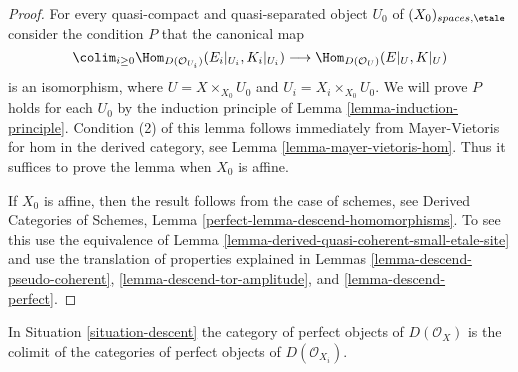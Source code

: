 \begin{proof}
For every quasi-compact and quasi-separated object $U_0$ of
$(X_0)_{spaces, \etale}$ consider the condition $P$ that the canonical
map
$$
\colim_{i \geq 0} \Hom_{D(\mathcal{O}_{U_i})}(E_i|_{U_i}, K_i|_{U_i})
\longrightarrow
\Hom_{D(\mathcal{O}_U)}(E|_U, K|_U)
$$
is an isomorphism, where $U = X \times_{X_0} U_0$ and
$U_i = X_i \times_{X_0} U_0$. We will prove $P$ holds for each $U_0$
by the induction principle of Lemma \ref{lemma-induction-principle}.
Condition (2) of this lemma follows immediately from Mayer-Vietoris
for hom in the derived category, see Lemma \ref{lemma-mayer-vietoris-hom}.
Thus it suffices to prove the lemma when $X_0$ is affine.

\medskip\noindent
If $X_0$ is affine, then the result follows from the case of schemes, see
Derived Categories of Schemes, Lemma \ref{perfect-lemma-descend-homomorphisms}.
To see this use the equivalence of
Lemma \ref{lemma-derived-quasi-coherent-small-etale-site}
and use the translation of properties explained in
Lemmas \ref{lemma-descend-pseudo-coherent},
\ref{lemma-descend-tor-amplitude}, and
\ref{lemma-descend-perfect}.
\end{proof}

\begin{lemma}
\label{lemma-perfect-on-limit}
In Situation \ref{situation-descent} the category of perfect
objects of $D(\mathcal{O}_X)$ is the colimit of the categories
of perfect objects of $D(\mathcal{O}_{X_i})$.
\end{lemma}

